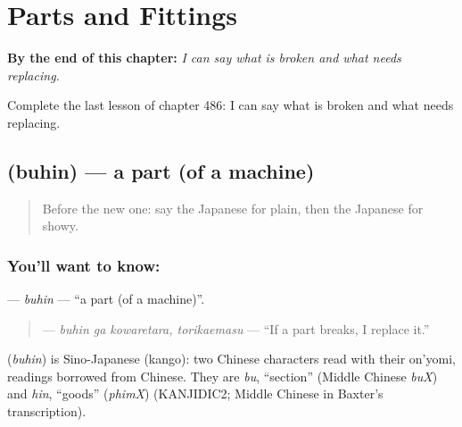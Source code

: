 
\chapter{Parts and Fittings}
\label{ch:ja-parts-and-fittings}

\begin{chapteropening}
\textbf{By the end of this chapter:} \emph{I can say what is broken and what needs replacing.}

Complete the last lesson of chapter 486: I can say what is broken and what needs replacing.
\end{chapteropening}

\section[\texorpdfstring{\ja{ぶひん} (buhin)}{ぶひん (buhin)}]{ (buhin) — a part (of a machine)}

\label{lesson:JA-C486-buhin}



\begin{quote}
Before the new one: say the Japanese for plain, then the Japanese for showy.
\end{quote}

\subsection*{You'll want to know: }
\textbf{} — \emph{buhin} — \textquotedblleft{}a part (of a machine)\textquotedblright{}.

\begin{quote}
\textbf{ } — \emph{buhin ga kowaretara, torikaemasu} — \textquotedblleft{}If a part breaks, I replace it.\textquotedblright{}
\end{quote}

\begin{cousinweb}
\textbf{} (\emph{buhin}) is Sino-Japanese (kango): two Chinese characters read with their on'yomi, readings borrowed from Chinese. They are \emph{bu}, \textquotedblleft{}section\textquotedblright{} (Middle Chinese \emph{buX}) and \emph{hin}, \textquotedblleft{}goods\textquotedblright{} (\emph{phimX}) (KANJIDIC2; Middle Chinese in Baxter's transcription).
\end{cousinweb}

